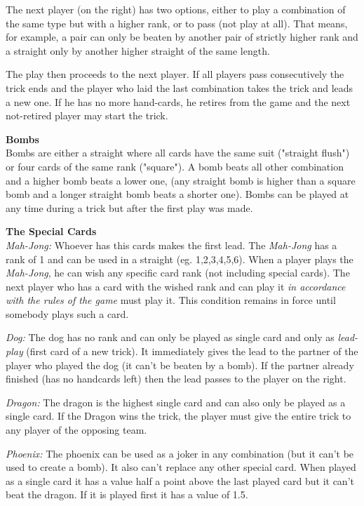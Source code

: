 \noindent The next player (on the right) has two options, either to play a combination of the same type but with a higher rank, or to pass (not play at all). That means, for example, a pair can only be beaten by another pair of strictly higher rank and a straight only by another higher straight of the same length.

\noindent The play then proceeds to the next player. If all players pass consecutively the trick ends and the player who laid the last combination takes the trick and leads a new one. If he has no more hand-cards, he retires from the game and the next not-retired player may start the trick.

\noindent\textbf{Bombs} \\
Bombs are either a straight where all cards have the same suit ("straight flush") or four cards of the same rank ("square").
A bomb beats all other combination and a higher bomb beats a lower one, (any straight bomb is higher than a square bomb and a longer straight bomb beats a shorter one).
Bombs can be played at any time during a trick but after the first play was made.

\noindent\textbf{The Special Cards}\\
\noindent \textit{Mah-Jong:} Whoever has this cards makes the first lead. The \textit{Mah-Jong} has a rank of 1 and can be used in a straight (eg. 1,2,3,4,5,6).
When a player plays the \textit{Mah-Jong}, he can wish any specific card rank (not including special cards). The next player who has a card with the wished rank and can play it \textit{in accordance with the rules of the game} must play it. This condition remains in force until somebody plays such a card.

\noindent \textit{Dog:} The dog has no rank and can only be played as single card and only as \textit{lead-play} (first card of a new trick). It immediately gives the lead to the partner of the player who played the dog (it can't be beaten by a bomb). If the partner already finished (has no handcards left) then the lead passes to the player on the right.

\noindent \textit{Dragon:} The dragon is the highest single card and can also only be played as a single card. If the Dragon wins the trick, the player must give the entire trick to any player of the opposing team.

\noindent \textit{Phoenix:} The phoenix can be used as a joker in any combination (but it can't be used to create a bomb). It also can't replace any other special card.
When played as a single card it has a value half a point above the last played card but it can't beat the dragon. If it is played first it has a value of 1.5.


